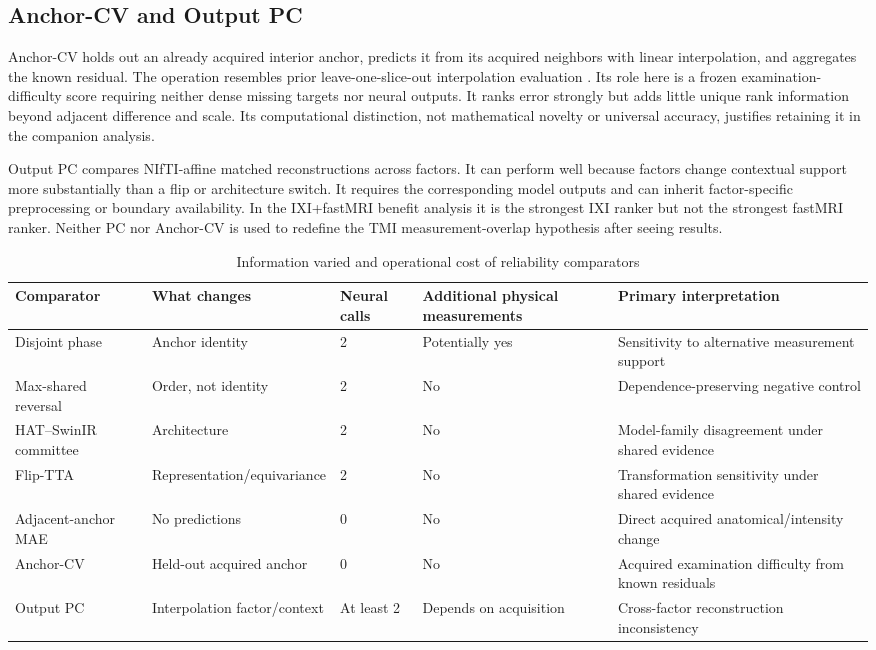 \documentclass[journal,10pt]{IEEEtran}
\begin{document}
\subsection{Anchor-CV and Output PC}
Anchor-CV holds out an already acquired interior anchor, predicts it from its acquired neighbors with linear interpolation, and aggregates the known residual. The operation resembles prior leave-one-slice-out interpolation evaluation \cite{horvath2017highorder}. Its role here is a frozen examination-difficulty score requiring neither dense missing targets nor neural outputs. It ranks error strongly but adds little unique rank information beyond adjacent difference and scale. Its computational distinction, not mathematical novelty or universal accuracy, justifies retaining it in the companion analysis.

Output PC compares NIfTI-affine matched reconstructions across factors. It can perform well because factors change contextual support more substantially than a flip or architecture switch. It requires the corresponding model outputs and can inherit factor-specific preprocessing or boundary availability. In the IXI+fastMRI benefit analysis it is the strongest IXI ranker but not the strongest fastMRI ranker. Neither PC nor Anchor-CV is used to redefine the TMI measurement-overlap hypothesis after seeing results.

\begin{table}[t]
\caption{Information varied and operational cost of reliability comparators}
\label{tab:semantics}\centering\scriptsize
\begin{tabular}{p{2.4cm}p{3.1cm}p{2.2cm}p{2.2cm}p{5.0cm}}
\toprule
Comparator&What changes&Neural calls&Additional physical measurements&Primary interpretation\\
\midrule
Disjoint phase&Anchor identity&2&Potentially yes&Sensitivity to alternative measurement support\\
Max-shared reversal&Order, not identity&2&No&Dependence-preserving negative control\\
HAT--SwinIR committee&Architecture&2&No&Model-family disagreement under shared evidence\\
Flip-TTA&Representation/equivariance&2&No&Transformation sensitivity under shared evidence\\
Adjacent-anchor MAE&No predictions&0&No&Direct acquired anatomical/intensity change\\
Anchor-CV&Held-out acquired anchor&0&No&Acquired examination difficulty from known residuals\\
Output PC&Interpolation factor/context&At least 2&Depends on acquisition&Cross-factor reconstruction inconsistency\\
\bottomrule
\end{tabular}
\end{table}
\end{document}
